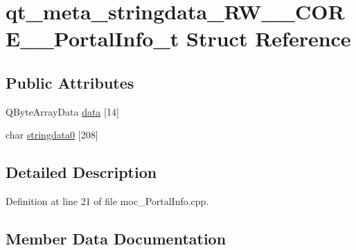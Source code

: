 \hypertarget{structqt__meta__stringdata___r_w_____c_o_r_e_____portal_info__t}{}\section{qt\+\_\+meta\+\_\+stringdata\+\_\+\+R\+W\+\_\+\+\_\+\+C\+O\+R\+E\+\_\+\+\_\+\+Portal\+Info\+\_\+t Struct Reference}
\label{structqt__meta__stringdata___r_w_____c_o_r_e_____portal_info__t}
\subsection*{Public Attributes}
\begin{DoxyCompactItemize}
\item 
Q\+Byte\+Array\+Data \hyperlink{structqt__meta__stringdata___r_w_____c_o_r_e_____portal_info__t_a5c5462c9e400d81ca69701585dcf44c0}{data} \mbox{[}14\mbox{]}
\item 
char \hyperlink{structqt__meta__stringdata___r_w_____c_o_r_e_____portal_info__t_a1ad3d524b97d8b9d7602da3f49431797}{stringdata0} \mbox{[}208\mbox{]}
\end{DoxyCompactItemize}


\subsection{Detailed Description}


Definition at line 21 of file moc\+\_\+\+Portal\+Info.\+cpp.



\subsection{Member Data Documentation}
\hypertarget{structqt__meta__stringdata___r_w_____c_o_r_e_____portal_info__t_a5c5462c9e400d81ca69701585dcf44c0}{}\label{structqt__meta__stringdata___r_w_____c_o_r_e_____portal_info__t_a5c5462c9e400d81ca69701585dcf44c0} 
